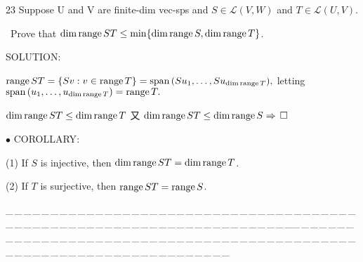 \documentclass[a4paper, 11pt, UTF8]{article}
\def\range{\textup{range}\,}
\def\Spn{\textup{span}\,}
\def\Lm{\mathcal{L}}
\begin{document}
\begin{large}
{\timesbf\Large 23} {\timessl\Large 
Suppose U and V are finite-dim vec-sps and $S\in\Lm(V, W)$ and $T\in\Lm(U, V)$.}\par\quad\,
{\timessl\Large Prove that $\dim\range ST\leq\min\{\dim \range S, \dim\range T\}$.}\par
{\timesbf S\footnotesize{OLUTION:}}\par\quad
$\range ST=\{Sv:v\in\range T\}=\Spn(Su_1,\dots,Su_{\dim\range T}),$ letting $\Spn(u_1,\dots,u_{\dim\range T})=\range T.$\par\quad$\dim\range ST\leq \dim\range T$
又 $\dim\range ST\leq \dim\range S\Rightarrow\,\square$\par
{\small $\bullet$} {\timesbf\normalsize C{\footnotesize OROLLARY}:}\par\quad
(1) If $S$ is injective, then $\dim\range ST=\dim\range T$.\par\quad
(2) If $T$ is surjective, then $\range ST=\range S$.\par
{\tiny \_\,\_\,\_\,\_\,\_\,\_\,\_\,\_\,\_\,\_\,\_\,\_\,\_\,\_\,\_\,\_\,\_\,\_\,\_\,\_\,\_\,\_\,\_\,\_\,\_\,\_\,\_\,\_\,\_\,\_\,\_\,\_\,\_\,\_\,\_\,\_\,\_\,\_\,\_\,\_\,\_\,\_\,\_\,\_\,\_\,\_\,\_\,\_\,\_\,\_\,\_\,\_\,\_\,\_\,\_\,\_\,\_\,\_\,\_\,\_\,\_\,\_\,\_\,\_\,\_\,\_\,\_\,\_\,\_\,\_\,\_\_\,\_\,\_\,\_\,\_\,\_\,\_\,\_\,\_\,\_\,\_\,\_\,\_\,\_\,\_\,\_\,\_\,\_\,\_\,\_\,\_\,\_\,\_\,\_\,\_\,\_\,\_\,\_\,\_\,\_\,\_\,\_\,\_\,\_\,\_\,\_\,\_\,\_\,\_\,\_\,\_\,\_\,\_\,\_\,\_\,\_\,\_\,\_\,\_\,\_\,\_\,\_\,\_\,\_\,\_\,\_\,\_\,\_\,\_\,\_\,\_\,\_\,\_\,\_\,\_\,\_\,\_\,\_\,\_\,\_\,\_}\par


\end{large}
\end{document}
